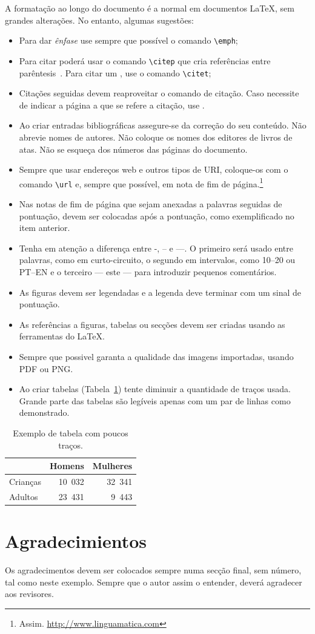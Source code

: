 \documentclass[a4paper, twocolumn, 11pt, twoside]{article}
\begin{document}
A formatação ao longo do documento é a normal em documentos \LaTeX, sem grandes alterações. No entanto,
algumas sugestões:
\begin{itemize}
\item Para dar \emph{ênfase} use sempre que possível o comando \verb.\emph.;
\item Para citar poderá usar o comando \verb.\citep. que cria referências entre
  parêntesis~\citep{latex}. Para citar um \citet{autor}, use o comando \verb.\citet.;
\item Citações seguidas devem reaproveitar o comando de citação. Caso necessite de indicar a página
  a que se refere a citação, use \citep[p.~40]{latex}.
\item Ao criar entradas bibliográficas assegure-se da correção do seu
  conteúdo. Não abrevie nomes de autores. Não coloque os nomes dos
  editores de livros de atas. Não se esqueça dos números das páginas
  do documento.
\item Sempre que usar endereços web e outros tipos de URI, coloque-os com o comando \verb.\url. e,
  sempre que possível, em nota de fim de página.\footnote{Assim. \url{http://www.linguamatica.com}}
\item Nas notas de fim de página que sejam anexadas a palavras seguidas de pontuação, devem ser colocadas
  após a pontuação, como exemplificado no item anterior.
\item Tenha em atenção a diferença entre -, -- e ---. O primeiro será usado entre palavras, como em
  curto-circuito, o segundo em intervalos, como 10--20 ou PT--EN e o terceiro --- este --- para
  introduzir pequenos comentários.
\item As figuras devem ser legendadas e a legenda deve terminar com um sinal de pontuação.
\item As referências a figuras, tabelas ou secções devem ser criadas usando as ferramentas do \LaTeX{}.
\item Sempre que possivel garanta a qualidade das imagens importadas, usando PDF ou PNG.
\item Ao criar tabelas (Tabela~\ref{tab:1}) tente diminuir a quantidade de traços usada. Grande parte das
  tabelas são legíveis apenas com um par de linhas como demonstrado.
\end{itemize}

\begin{table}[htb]
  \centering
  \begin{tabular}{lrr}
    \toprule
    & \textbf{Homens} & \textbf{Mulheres} \\
    \midrule
    Crianças & 10~032 & 32~341 \\
    Adultos & 23~431 & 9~443 \\
    \bottomrule
  \end{tabular}
  \caption{Exemplo de tabela com poucos traços.}
  \label{tab:1}
\end{table}



\section*{Agradecimientos}

Os agradecimentos devem ser colocados sempre numa secção final, sem número, tal como
neste exemplo. Sempre que o autor assim o entender, deverá agradecer aos revisores.



\end{document}
